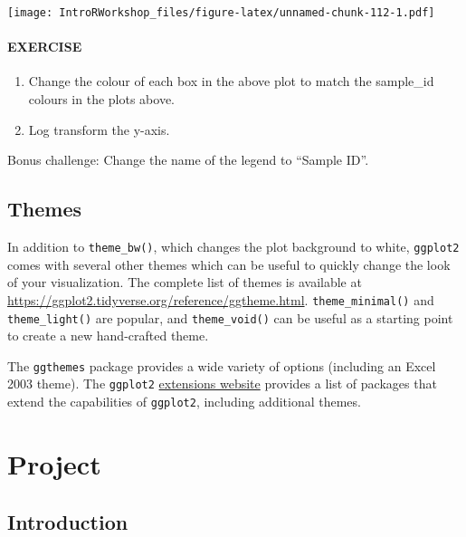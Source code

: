 \documentclass[
]{book}
\providecommand{\tightlist}{%
  \setlength{\itemsep}{0pt}\setlength{\parskip}{0pt}}
\begin{document}
\texttt{[image: IntroRWorkshop\_files/figure-latex/unnamed-chunk-112-1.pdf]}

\hypertarget{exercise-7}{%
\subsubsection*{EXERCISE}\label{exercise-7}}

\begin{enumerate}
\def\labelenumi{\arabic{enumi}.}
\tightlist
\item
  Change the colour of each box in the above plot to match the sample\_id colours in the plots above.
\item
  Log transform the y-axis.
\end{enumerate}

Bonus challenge: Change the name of the legend to ``Sample ID''.

\hypertarget{themes}{%
\section{Themes}\label{themes}}

In addition to \texttt{theme\_bw()}, which changes the plot background to white, \texttt{ggplot2} comes with several other themes which can be useful to quickly change the look of your visualization. The complete list of themes is available at \url{https://ggplot2.tidyverse.org/reference/ggtheme.html}. \texttt{theme\_minimal()} and \texttt{theme\_light()} are popular, and \texttt{theme\_void()} can be useful as a starting point to create a new hand-crafted theme.

The \texttt{ggthemes} package provides a wide variety of options (including an Excel 2003 theme). The \texttt{ggplot2} \href{https://www.ggplot2-exts.org}{extensions website} provides a list of packages that extend the capabilities of \texttt{ggplot2}, including additional themes.

\hypertarget{project}{%
\chapter{Project}\label{project}}

\hypertarget{introduction-1}{%
\section*{Introduction}\label{introduction-1}}
\end{document}
